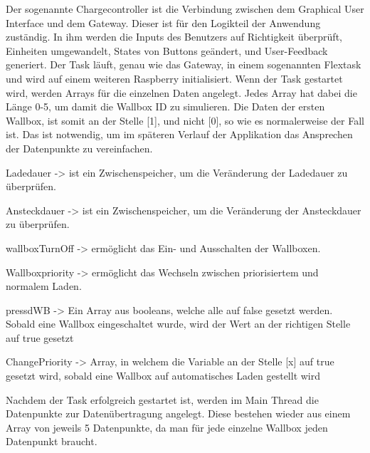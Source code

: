 Der sogenannte Chargecontroller ist die Verbindung zwischen dem Graphical User Interface und dem Gateway. Dieser ist für den Logikteil der Anwendung zuständig. In ihm werden die Inputs des Benutzers auf Richtigkeit überprüft, Einheiten umgewandelt, States von Buttons geändert, und User-Feedback generiert. Der Task läuft, genau wie das Gateway, in einem sogenannten Flextask und wird auf einem weiteren Raspberry initialisiert. Wenn der Task gestartet wird, werden Arrays für die einzelnen Daten angelegt. Jedes Array hat dabei die Länge 0-5, um damit die Wallbox ID zu simulieren. Die Daten der ersten Wallbox, ist somit an der Stelle [1], und nicht [0], so wie es normalerweise der Fall ist. Das ist notwendig, um im späteren Verlauf der Applikation das Ansprechen der Datenpunkte zu vereinfachen. 
\begin{compactitem}
  \item Ladedauer -> ist ein Zwischenspeicher, um die Veränderung der Ladedauer zu überprüfen.  
  \item Ansteckdauer -> ist ein Zwischenspeicher, um die Veränderung der Ansteckdauer zu überprüfen. 
  \item wallboxTurnOff -> ermöglicht das Ein- und Ausschalten der Wallboxen. 
  \item Wallboxpriority -> ermöglicht das Wechseln zwischen priorisiertem und normalem Laden. 
  \item pressdWB -> Ein Array aus booleans, welche alle auf false gesetzt werden. Sobald eine Wallbox eingeschaltet wurde, wird der Wert an der richtigen Stelle auf true gesetzt 
  \item ChangePriority -> Array, in welchem die Variable an der Stelle [x] auf true gesetzt wird, sobald eine Wallbox auf automatisches Laden gestellt wird 
\end{compactitem}

Nachdem der Task erfolgreich gestartet ist, werden im Main Thread die Datenpunkte zur Datenübertragung angelegt. Diese bestehen wieder aus einem Array von jeweils 5 Datenpunkte, da man für jede einzelne Wallbox jeden Datenpunkt braucht.  

